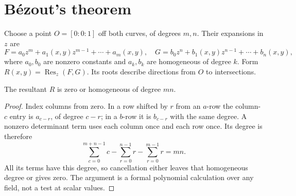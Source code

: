 \section{B\'ezout's theorem}

Choose a point $O=[0:0:1]$ off both curves, of degrees $m,n$. Their expansions in $z$ are
\[
F=a_0z^m+a_1(x,y)z^{m-1}+\cdots+a_m(x,y),\quad
G=b_0z^n+b_1(x,y)z^{n-1}+\cdots+b_n(x,y),
\]
where $a_0,b_0$ are nonzero constants and $a_k,b_k$ are homogeneous of degree $k$. Form $R(x,y)=\operatorname{Res}_z(F,G)$. Its roots describe directions from $O$ to intersections.

\begin{lemma}\label{geometry:lem:reshomog}
The resultant $R$ is zero or homogeneous of degree $mn$.
\end{lemma}
\begin{proof}
Index columns from zero. In a row shifted by $r$ from an $a$-row the column-$c$ entry is $a_{c-r}$, of degree $c-r$; in a $b$-row it is $b_{c-r}$ with the same degree. A nonzero determinant term uses each column once and each row once. Its degree is therefore
\[
\sum_{c=0}^{m+n-1}c-\sum_{r=0}^{n-1}r-\sum_{r=0}^{m-1}r=mn.
\]
All its terms have this degree, so cancellation either leaves that homogeneous degree or gives zero. The argument is a formal polynomial calculation over any field, not a test at scalar values.
\end{proof}


